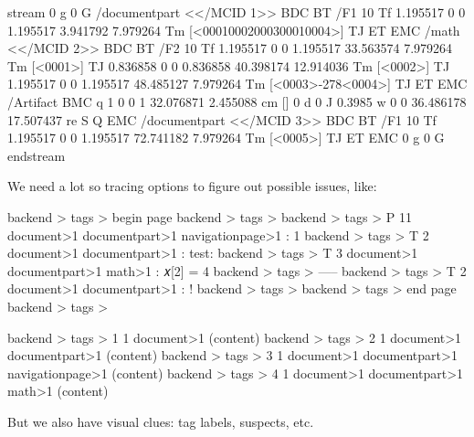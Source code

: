 
\starttyping[style=\ttxx\setupinterlinespace]
stream
0 g 0 G
/documentpart <</MCID 1>> BDC
BT
/F1 10 Tf
1.195517 0 0 1.195517 3.941792 7.979264 Tm [<00010002000300010004>] TJ
ET
EMC
/math <</MCID 2>> BDC
BT
/F2 10 Tf
1.195517 0 0 1.195517 33.563574 7.979264 Tm [<0001>] TJ
0.836858 0 0 0.836858 40.398174 12.914036 Tm [<0002>] TJ
1.195517 0 0 1.195517 48.485127 7.979264 Tm [<0003>-278<0004>] TJ
ET
EMC
/Artifact BMC
q
1 0 0 1 32.076871 2.455088 cm
[] 0 d 0 J 0.3985 w 0 0 36.486178 17.507437 re S
Q
EMC
/documentpart <</MCID 3>> BDC
BT
/F1 10 Tf
1.195517 0 0 1.195517 72.741182 7.979264 Tm [<0005>] TJ
ET
EMC
0 g 0 G
endstream
\stoptyping


\page

We need a lot so tracing options to figure out possible issues, like:

\starttyping[style=\ttxx\setupinterlinespace]
backend         > tags > begin page
backend         > tags >
backend         > tags > P    11 document>1 documentpart>1 navigationpage>1 : 1
backend         > tags > T     2 document>1 documentpart>1 : test:
backend         > tags > T     3 document>1 documentpart>1 math>1 : 𝑥[2] = 4
backend         > tags >   -----
backend         > tags > T     2 document>1 documentpart>1 : !
backend         > tags >
backend         > tags > end page
backend         > tags >

backend         > tags >     1    1  document>1 (content)
backend         > tags >     2    1  document>1 documentpart>1 (content)
backend         > tags >     3    1  document>1 documentpart>1 navigationpage>1 (content)
backend         > tags >     4    1  document>1 documentpart>1 math>1 (content)
\stoptyping

But we also have visual clues: tag labels, suspects, etc.

\stoptitle

\starttitle[title={Checking if we're okay}]

